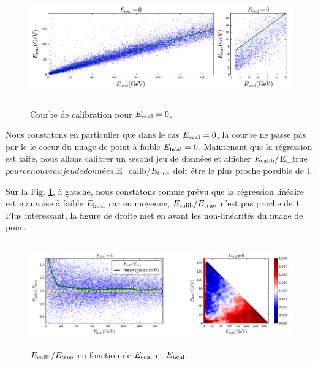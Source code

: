 \documentclass[11pt,a4paper]{article}
\begin{document}
\begin{figure}[!h]
\begin{center}
\includegraphics[height =5cm]{images/pictures/testLinearRegression/LinearRegression_calibration.png}
\caption{Courbe de calibration pour $E_{\rm ecal} = 0$.}
\end{center}
\end{figure}

Nous constatons en particulier que dans le cas  $E_{\rm ecal} = 0$, la courbe ne passe pas par le le coeur du nuage de point à faible  $E_{\rm hcal} = 0$. Maintenant que la régression est faite, nous allons calibrer un second jeu de données et afficher $E_{\rm calib}/$E_{\rm true}$ pour ce nouveau jeu de données. $E_{\rm calib}/$E_{\rm true}$ doit être le plus proche possible de 1.

Sur la Fig. \ref{LR_ecaliboveretrue_ecal_hcal}, à gauche, nous constatons comme prévu que la régression linéaire est mauvaise à faible $E_{\rm hcal}$ car en moyenne, $E_{\rm calib}/E_{\rm true}$ n'est pas proche de $1$. Plus intéressant, la figure de droite met en avant les non-linéarités du nuage de point.\\

\begin{figure}[!h]
\begin{center}
\includegraphics[height =4.5cm]{images/pictures/testLinearRegression/LinearRegression_ecalib_over_etrue_functionof_ecal_hcal.png}
\caption{$E_{\rm calib}/E_{\rm true}$ en fonction de $E_{\rm ecal}$ et $E_{\rm hcal}$.}
\label{LR_ecaliboveretrue_ecal_hcal}
\end{center}
\end{figure}
\end{document}
